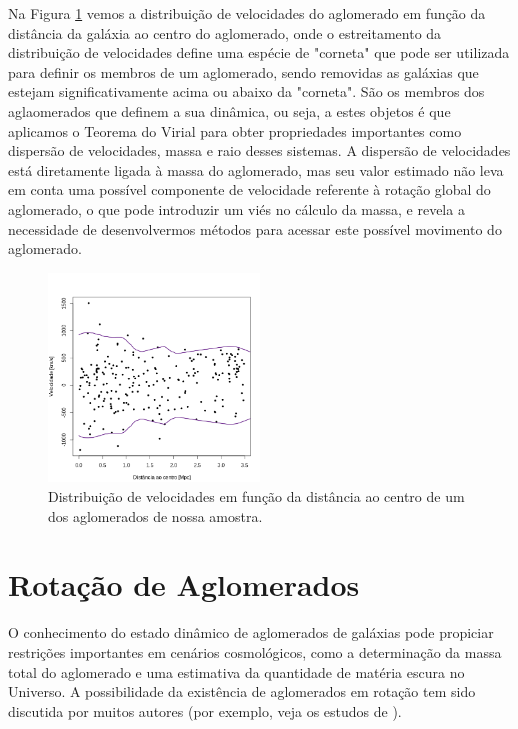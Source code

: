Na Figura \ref{fig2} vemos a distribuição de velocidades do aglomerado em função da distância da galáxia ao centro do aglomerado, onde o estreitamento da distribuição de velocidades define uma espécie de "corneta" que pode ser utilizada para definir os membros de um aglomerado, sendo removidas as galáxias que estejam significativamente acima ou abaixo da "corneta". São os membros dos aglaomerados que definem a sua dinâmica, ou seja,
a estes objetos é que aplicamos o Teorema do Virial para obter propriedades importantes como dispersão de velocidades, massa e raio desses sistemas.
A dispersão de velocidades está diretamente ligada à massa do aglomerado, mas seu valor estimado não leva em conta
uma possível componente de velocidade referente à rotação global do aglomerado, o que pode introduzir um viés no cálculo da massa,
e revela a necessidade de desenvolvermos métodos para acessar este possível movimento do aglomerado.

\begin{figure}[H]
	\centering
	\includegraphics[width=0.5\textwidth]{04-figuras/10043}
	\caption{Distribuição de velocidades em função da distância ao centro de um dos aglomerados de nossa amostra.}
	\label{fig2}
\end{figure}

\section{Rotação de Aglomerados}

O conhecimento do estado dinâmico de aglomerados de galáxias pode propiciar restrições importantes em cenários cosmológicos, como a determinação da massa total do aglomerado e uma estimativa da quantidade de matéria escura no Universo. A possibilidade da existência de aglomerados em rotação tem sido discutida por muitos autores (por exemplo, veja os estudos de \cite{hwang2007searching, manolopoulou2016galaxy}). 


